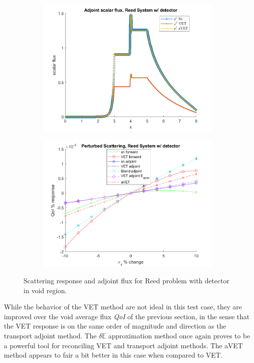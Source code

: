 \documentclass[12pt]{report}
\newcommand{\Edd}{\mathbb{E}}
\newcommand{\qoi}{{\it QoI}\xspace}
\begin{document}
\begin{figure}[H]
\centering
\begin{subfigure}{.5\textwidth}
  \centering
  \includegraphics[width=.98\linewidth]{figures2/775phia.png}
\end{subfigure}%
\begin{subfigure}{.5\textwidth}
  \centering
  \includegraphics[width=.98\linewidth]{figures2/775sigsSens.png}
\end{subfigure}
\caption{Scattering response and adjoint flux for Reed problem with detector in void region.}
\label{Reed6}
\end{figure}
While the behavior of the VET method are not ideal in this test case, they are improved over the void average flux \qoi of the previous section, in the sense that the VET response is on the same order of magnitude and direction as the transport adjoint method. The $\delta \Edd$ approximation method once again proves to be a powerful tool for reconciling VET and transport adjoint methods. The aVET method appears to fair a bit better in this case when compared to VET.
\end{document}
